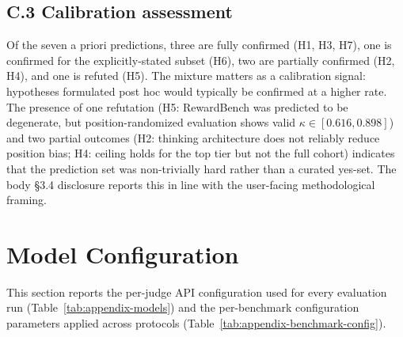 \subsection*{C.3 Calibration assessment}

Of the seven a priori predictions, three are fully confirmed (H1, H3,
H7), one is confirmed for the explicitly-stated subset (H6), two are
partially confirmed (H2, H4), and one is refuted (H5). The mixture
matters as a calibration signal: hypotheses formulated post hoc would
typically be confirmed at a higher rate. The presence of one
refutation (H5: RewardBench was predicted to be degenerate, but
position-randomized evaluation shows valid $\kappa \in [0.616, 0.898]$)
and two partial outcomes (H2: thinking architecture does not reliably
reduce position bias; H4: ceiling holds for the top tier but not the
full cohort) indicates that the prediction set was non-trivially hard
rather than a curated yes-set. The body §3.4 disclosure reports this
in line with the user-facing methodological framing.


\clearpage
\section{Model Configuration}
\label{app:model-config}

This section reports the per-judge API configuration used for every
evaluation run (Table~\ref{tab:appendix-models}) and the per-benchmark
configuration parameters applied across protocols
(Table~\ref{tab:appendix-benchmark-config}).

